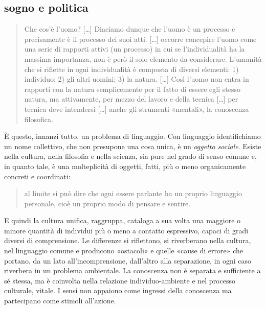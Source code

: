 \subsection{sogno e politica}

\begin{quote}
  Che cos'è l'uomo? %
  [\ldots] Diaciamo dunque che l'uomo è un processo e precisamente è il
  processo dei suoi atti. [\ldots] occorre concepire l'uomo come una serie di
  rapporti attivi (un processo) in cui se l'individualità ha la massima
  importanza, non è però il solo elemento da considerare. L'umanità che si
  riflette in ogni individualità è composta di diversi elementi: 1) individuo;
  2) gli altri uomini; 3) la natura. [\ldots] Così l'uomo non entra in rapporti
  con la natura semplicemente per il fatto di essere egli stesso natura, ma
  attivamente, per mezzo del lavoro e della tecnica [\ldots] per tecnica deve
  intendersi [\ldots] anche gli strumenti «mentali», la conoscenza filosofica.
\end{quote}%

È questo, innanzi tutto, un problema di linguaggio. Con linguaggio identifichiamo
un nome collettivo, che non presupone una cosa unica, è un \emph{oggetto sociale}.
\cite{ag:matst, ferraris2014} Esiste nella cultura, nella filosofia e nella
scienza, sia pure nel grado di senso comune e, in quanto tale, è una
molteplicità di oggetti, fatti, più o meno organicamente concreti e coordinati:

\begin{quote}
  al limite si può dire che ogni essere parlante ha un proprio linguaggio
  personale, cioè un proprio modo di pensare e sentire. \cite{ag:matst}
\end{quote}

E quindi la cultura unifica, raggruppa, cataloga a sua volta una maggiore o
minore quantità di individui più o meno a contatto espressivo, capaci di gradi
diversi di comprensione. Le differenze si riflettono, si riverberano nella
cultura, nel linguaggio comune e producono «ostacoli» e quelle «cause di errore»
che portano, da un lato all'incomprensione, dall'altro alla separazione, in
ogni caso riverbera in un problema ambientale. La conoscenza non è separata e
sufficiente a sé stessa, ma è coinvolta nella relazione individuo-ambiente e
nel processo culturale, vitale. I sensi non appaiono come ingressi della
conoscenza ma partecipano come stimoli all’azione.

